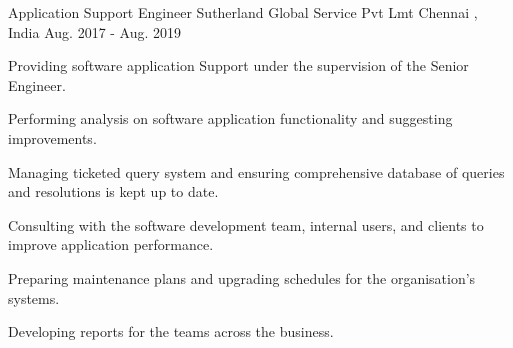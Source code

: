 \begin{cventries}
  \cventry
    {Application Support Engineer} %
    {Sutherland Global Service Pvt Lmt} %
    {Chennai , India} %
    {Aug. 2017 - Aug. 2019} %
    {
      \begin{cvitems} %
        \item {Providing software application Support under the supervision of the Senior Engineer.}
        \item {Performing analysis on software application functionality and suggesting improvements.}
        \item {Managing ticketed query system and ensuring comprehensive database of queries and resolutions is kept up to date.}
        \item {Consulting with the software development team, internal users, and clients to improve application performance.}
        \item {Preparing maintenance plans and upgrading schedules for the organisation's systems.}
        \item {Developing reports for the teams across the business.}
      \end{cvitems}
    }

\end{cventries}

